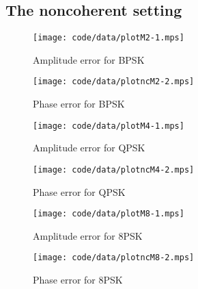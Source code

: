 \documentclass[a4paper,10pt]{article}
\begin{document}

\subsection{The noncoherent setting}

 \begin{figure*}[tp]
 	\centering
 		\texttt{[image: code/data/plotM2-1.mps]}
 		\caption{Amplitude error for BPSK}
 		\label{fig:plotamp}
 \end{figure*}


\begin{figure*}[tp]
	\centering
		\texttt{[image: code/data/plotncM2-2.mps]}
		\caption{Phase error for BPSK}
		\label{fig:plotphase}
\end{figure*}


 \begin{figure*}[tp]
 	\centering
 		\texttt{[image: code/data/plotM4-1.mps]}
 		\caption{Amplitude error for QPSK}
 		\label{fig:plotamp}
 \end{figure*}


\begin{figure*}[tp]
	\centering
		\texttt{[image: code/data/plotncM4-2.mps]}
		\caption{Phase error for QPSK}
		\label{fig:plotphase}
\end{figure*}


 \begin{figure*}[tp]
 	\centering
 		\texttt{[image: code/data/plotM8-1.mps]}
 		\caption{Amplitude error for 8PSK}
 		\label{fig:plotamp}
 \end{figure*}


\begin{figure*}[tp]
	\centering
		\texttt{[image: code/data/plotncM8-2.mps]}
		\caption{Phase error for 8PSK}
		\label{fig:plotphase}
\end{figure*}
\end{document}
